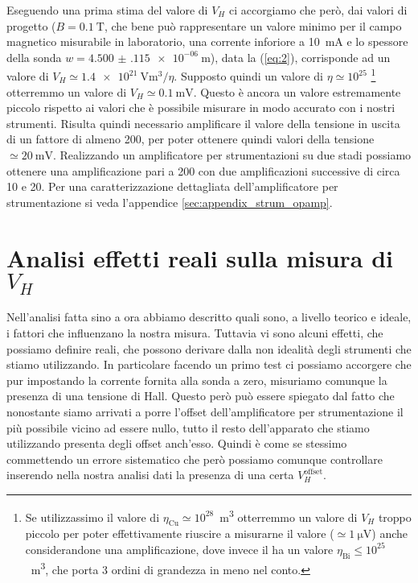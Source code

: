 \documentclass[
    prl,
    reprint, 
    superscriptaddress, 
    altaffilletter, 
    amsmath, 
    amssymb, 
    a4paper,
    varvw]{revtex4-2}
\begin{document}
Eseguendo una prima stima del valore di $V_H$ ci accorgiamo che però, dai valori di progetto ($B=\SI{0.1}{\tesla}$, che bene può rappresentare un valore minimo per il campo magnetico misurabile in laboratorio, una corrente inforiore a \SI{10}{\milli\ampere} e lo spessore della sonda $w=\SI{4.500(115)e-06}{\metre}$), data la (\ref{eq:2}), corrisponde ad un valore di $V_H \simeq\SI[exponent-mode = scientific]{1.4e21}{\volt\cubic\metre}/\eta$. Supposto quindi un valore di $\eta\simeq10^{25}$ \footnote{Se utilizzassimo il valore di $\eta_\text{Cu}\simeq10^{28}$\si{\per\cubic\metre} otterremmo un valore di $V_H$ troppo piccolo per poter effettivamente riuscire a misurarne il valore ($\simeq\SI{1}{\micro\volt}$) anche considerandone una amplificazione, dove invece il  ha un valore $\eta_\text{Bi}\leq10^{25}$ \si{\per\cubic\metre}, che porta 3 ordini di grandezza in meno nel conto.} otterremmo un valore di $V_H\simeq\SI{0.1}{\milli\volt}$. Questo è ancora un valore estremamente piccolo rispetto ai valori che è possibile misurare in modo accurato con i nostri strumenti. Risulta quindi necessario amplificare il valore della tensione in uscita di un fattore di almeno 200, per poter ottenere quindi valori della tensione $\simeq\SI{20}{\milli\volt}$. Realizzando un amplificatore per strumentazioni su due stadi possiamo ottenere una amplificazione pari a 200 con due amplificazioni successive di circa 10 e 20. Per una caratterizzazione dettagliata dell'amplificatore per strumentazione si veda l'appendice \ref{sec:appendix_strum_opamp}.

\section{Analisi effetti reali sulla misura di $V_H$}
Nell'analisi fatta sino a ora abbiamo descritto quali sono, a livello teorico e ideale, i fattori che influenzano la nostra misura. Tuttavia vi sono alcuni effetti, che possiamo definire reali, che possono derivare dalla non idealità degli strumenti che stiamo utilizzando. In particolare facendo un primo test ci possiamo accorgere che pur impostando la corrente fornita alla sonda a zero, misuriamo comunque la presenza di una tensione di Hall. Questo però può essere spiegato dal fatto che nonostante siamo arrivati a porre l'offset dell'amplificatore per strumentazione il più possibile vicino ad essere nullo, tutto il resto dell'apparato che stiamo utilizzando presenta degli offset anch'esso. Quindi è come se stessimo commettendo un errore sistematico che però possiamo comunque controllare inserendo nella nostra analisi dati la presenza di una certa $V_H^\text{offset}$. 
\end{document}
